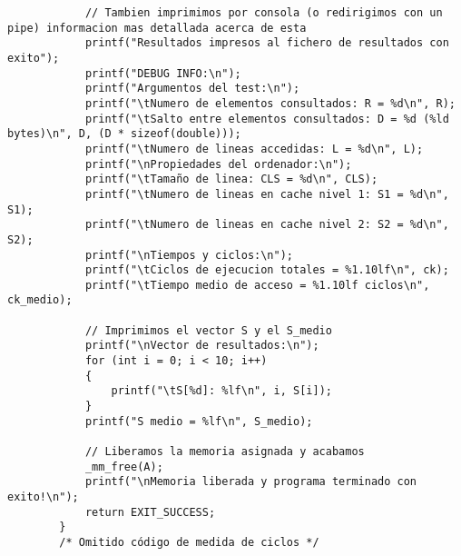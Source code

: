 \documentclass[a4paper,twocolumn]{article}
\begin{document}
\begin{lstlisting}
            // Tambien imprimimos por consola (o redirigimos con un pipe) informacion mas detallada acerca de esta
            printf("Resultados impresos al fichero de resultados con exito");
            printf("DEBUG INFO:\n");
            printf("Argumentos del test:\n");
            printf("\tNumero de elementos consultados: R = %d\n", R);
            printf("\tSalto entre elementos consultados: D = %d (%ld bytes)\n", D, (D * sizeof(double)));
            printf("\tNumero de lineas accedidas: L = %d\n", L);
            printf("\nPropiedades del ordenador:\n");
            printf("\tTamaño de linea: CLS = %d\n", CLS);
            printf("\tNumero de lineas en cache nivel 1: S1 = %d\n", S1);
            printf("\tNumero de lineas en cache nivel 2: S2 = %d\n", S2);
            printf("\nTiempos y ciclos:\n");
            printf("\tCiclos de ejecucion totales = %1.10lf\n", ck);
            printf("\tTiempo medio de acceso = %1.10lf ciclos\n", ck_medio);
        
            // Imprimimos el vector S y el S_medio
            printf("\nVector de resultados:\n");
            for (int i = 0; i < 10; i++)
            {
                printf("\tS[%d]: %lf\n", i, S[i]);
            }
            printf("S medio = %lf\n", S_medio);
        
            // Liberamos la memoria asignada y acabamos
            _mm_free(A);
            printf("\nMemoria liberada y programa terminado con exito!\n");
            return EXIT_SUCCESS;
        }
        /* Omitido código de medida de ciclos */
        \end{lstlisting}
        
\end{document}
